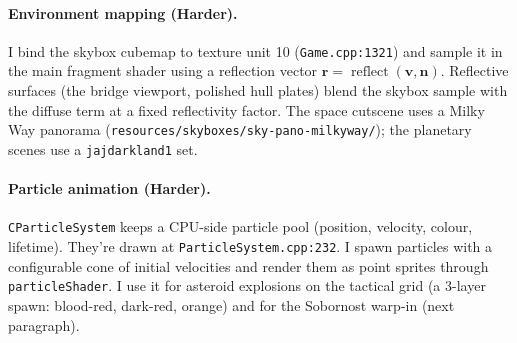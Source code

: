 \documentclass[11pt,a4paper]{article}
\begin{document}
\paragraph{Environment mapping (Harder).}
I bind the skybox cubemap to texture unit 10 (\texttt{Game.cpp:1321}) and
sample it in the main fragment shader using a reflection vector
$\mathbf{r} = \operatorname{reflect}(\mathbf{v}, \mathbf{n})$. Reflective
surfaces (the bridge viewport, polished hull plates) blend the skybox
sample with the diffuse term at a fixed reflectivity factor. The
space cutscene uses a Milky Way panorama
(\texttt{resources/skyboxes/sky-pano-milkyway/}); the planetary scenes use
a \texttt{jajdarkland1} set.


\paragraph{Particle animation (Harder).}
\texttt{CParticleSystem} keeps a CPU-side particle pool (position,
velocity, colour, lifetime). They're drawn at
\texttt{ParticleSystem.cpp:232}. I spawn particles with a configurable
cone of initial velocities and render them as point sprites through
\texttt{particleShader}. I use it for asteroid explosions on the tactical
grid (a 3-layer spawn: blood-red, dark-red, orange) and for the Sobornost
warp-in (next paragraph).


\end{document}
